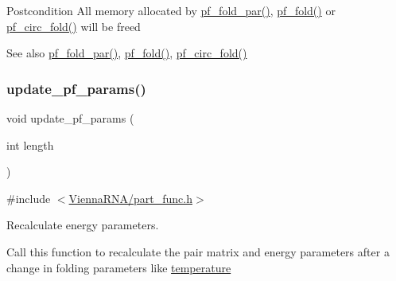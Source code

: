 \begin{DoxyPostcond}{Postcondition}
All memory allocated by \mbox{\hyperlink{group__part__func__global__deprecated_gac4f95bee734b2563a3d6e9932117ebdf}{pf\+\_\+fold\+\_\+par()}}, \mbox{\hyperlink{group__part__func__global__deprecated_gadc3db3d98742427e7001a7fd36ef28c2}{pf\+\_\+fold()}} or \mbox{\hyperlink{group__part__func__global__deprecated_ga819ce5fca8984004ac81c4a3b04cb735}{pf\+\_\+circ\+\_\+fold()}} will be free\textquotesingle{}d 
\end{DoxyPostcond}
\begin{DoxySeeAlso}{See also}
\mbox{\hyperlink{group__part__func__global__deprecated_gac4f95bee734b2563a3d6e9932117ebdf}{pf\+\_\+fold\+\_\+par()}}, \mbox{\hyperlink{group__part__func__global__deprecated_gadc3db3d98742427e7001a7fd36ef28c2}{pf\+\_\+fold()}}, \mbox{\hyperlink{group__part__func__global__deprecated_ga819ce5fca8984004ac81c4a3b04cb735}{pf\+\_\+circ\+\_\+fold()}} 
\end{DoxySeeAlso}
\mbox{\label{group__part__func__global__deprecated_ga384e927890f9c034ff09fa66da102d28}} 
\subsubsection{\texorpdfstring{update\_pf\_params()}{update\_pf\_params()}}
{\footnotesize\ttfamily void update\+\_\+pf\+\_\+params (\begin{DoxyParamCaption}\item[{int}]{length }\end{DoxyParamCaption})}



{\ttfamily \#include $<$\mbox{\hyperlink{part__func_8h}{Vienna\+R\+N\+A/part\+\_\+func.\+h}}$>$}



Recalculate energy parameters. 

Call this function to recalculate the pair matrix and energy parameters after a change in folding parameters like \mbox{\hyperlink{group__model__details_gab4b11c8d9c758430960896bc3fe82ead}{temperature}}

